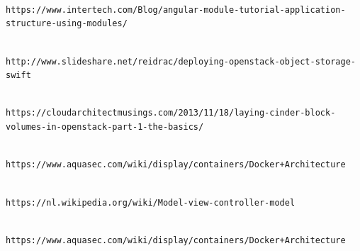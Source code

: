 \documentclass{article}
\begin{document}
% 
% 
\begin{thebibliography}{9}

    \\\texttt{https://www.intertech.com/Blog/angular-module-tutorial-application-structure-using-modules/}

	\\\texttt{http://www.slideshare.net/reidrac/deploying-openstack-object-storage-swift}

    \\\texttt{https://cloudarchitectmusings.com/2013/11/18/laying-cinder-block-volumes-in-openstack-part-1-the-basics/}

    \\\texttt{https://www.aquasec.com/wiki/display/containers/Docker+Architecture}

    \\\texttt{https://nl.wikipedia.org/wiki/Model-view-controller-model}

    \\\texttt{https://www.aquasec.com/wiki/display/containers/Docker+Architecture}

	\end{thebibliography}
\end{document}
